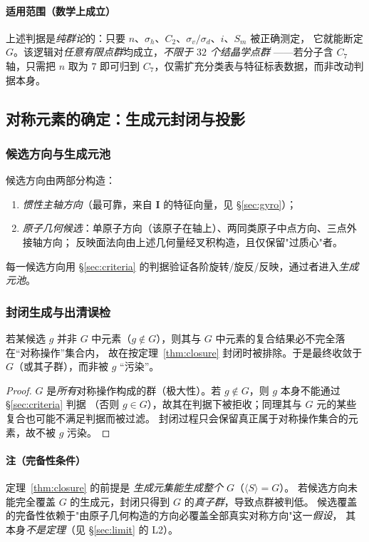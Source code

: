 \paragraph{适用范围（数学上成立）}
上述判据是\emph{纯群论}的：只要 $n$、$\sigma_h$、$C_2$、$\sigma_v/\sigma_d$、$i$、$S_m$ 被正确测定，
它就能断定 $G$。该逻辑对\emph{任意有限点群}均成立，\emph{不限于 $32$ 个结晶学点群}
——若分子含 $C_7$ 轴，只需把 $n$ 取为 $7$ 即可归到 $C_7$，仅需扩充分类表与特征标表数据，而非改动判据本身。

\subsection{对称元素的确定：生成元封闭与投影}\label{sec:proj}

\subsubsection{候选方向与生成元池}
候选方向由两部分构造：
\begin{enumerate}
  \item \emph{惯性主轴方向}（最可靠，来自 $\mathbf I$ 的特征向量，见 \S\ref{sec:gyro}）；
  \item \emph{原子几何候选}：单原子方向（该原子在轴上）、两同类原子中点方向、三点外接轴方向；
    反映面法向由上述几何量经叉积构造，且仅保留"过质心"者。
\end{enumerate}
每一候选方向用 \S\ref{sec:criteria} 的判据验证各阶旋转/旋反/反映，通过者进入\emph{生成元池}。

\subsubsection{封闭生成与出清误检}
\begin{lemma}[封闭性自动出清误检]\label{lem:selfclean}
  若某候选 $g$ 并非 $G$ 中元素（$g\notin G$），则其与 $G$ 中元素的复合结果必不完全落在“对称操作”集合内，
  故在按定理~\ref{thm:closure} 封闭时被排除。于是最终收敛于 $G$（或其子群），而非被 $g$ “污染”。
\end{lemma}
\begin{proof}
  $G$ 是\emph{所有}对称操作构成的群（极大性）。若 $g\notin G$，则 $g$ 本身不能通过 \S\ref{sec:criteria} 判据
  （否则 $g\in G$），故其在判据下被拒收；同理其与 $G$ 元的某些复合也可能不满足判据而被过滤。
  封闭过程只会保留真正属于对称操作集合的元素，故不被 $g$ 污染。\qedhere
\end{proof}

\paragraph{注（完备性条件）}
定理~\ref{thm:closure} 的前提是 \emph{生成元集能生成整个 $G$}（$\langle S\rangle=G$）。
若候选方向未能完全覆盖 $G$ 的生成元，封闭只得到 $G$ 的\emph{真子群}，导致点群被判低。
候选覆盖的完备性依赖于"由原子几何构造的方向必覆盖全部真实对称方向"这一\emph{假设}，
其本身\emph{不是定理}（见 \S\ref{sec:limit} 的 L2）。

